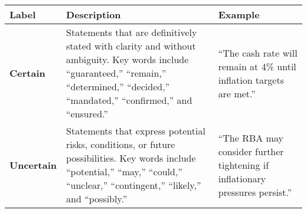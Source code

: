 \begin{table*}
    \caption{}
    \vspace{1em}
    \begin{tabular}{p{}p{}p{}}
    \toprule
    \textbf{Label} & \textbf{Description} & \textbf{Example} \\
    \midrule
    \textbf{Certain} & Statements that are definitively stated with clarity and without ambiguity. Key words include “guaranteed,” “remain,” “determined,” “decided,” “mandated,” “confirmed,” and “ensured.” & “The cash rate will remain at 4\% until inflation targets are met.” \\
    \midrule
    \textbf{Uncertain} & Statements that express potential risks, conditions, or future possibilities. Key words include “potential,” “may,” “could,” “unclear,” “contingent,” “likely,” and “possibly.” & “The RBA may consider further tightening if inflationary pressures persist.” \\
    \bottomrule
    \end{tabular}
    \label{tb:rba_certainty_guide}
    \end{table*}